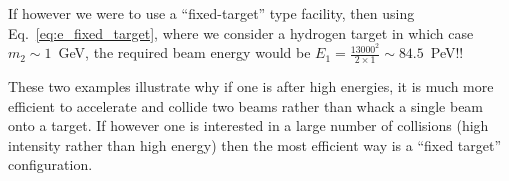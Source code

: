 If however we were to use a ``fixed-target'' type facility, then using Eq.~\ref{eq:e_fixed_target}, where we consider a hydrogen target in which case $m_{2}\sim 1$~GeV, the required beam energy would be $E_{1}=\frac{13000^2}{2\times1}\sim84.5$~PeV!!

These two examples illustrate why if one is after high energies, it is much more efficient to accelerate and collide two beams rather than whack a single beam onto a target. If however one is interested in a large number of collisions (high intensity rather than high energy) then the most efficient way is a ``fixed target'' configuration.



